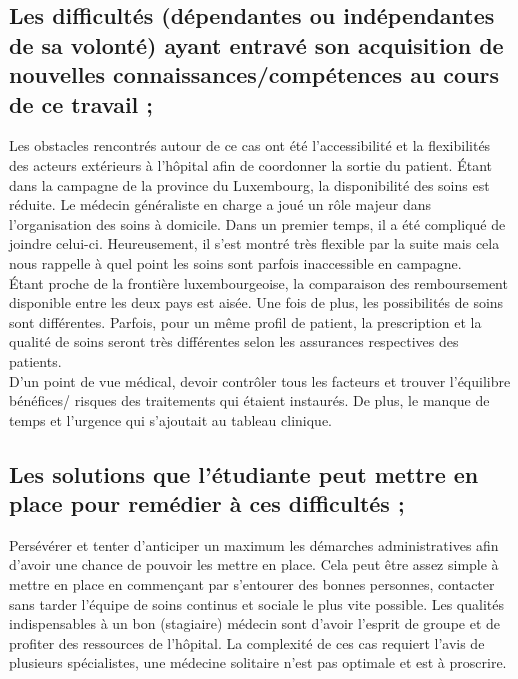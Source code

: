 \subsection{Les difficultés (dépendantes ou indépendantes de sa volonté) ayant entravé son acquisition de nouvelles connaissances/compétences au cours de ce travail ;}

Les obstacles rencontrés autour de ce cas ont été l’accessibilité et la flexibilités des acteurs extérieurs à l’hôpital afin de coordonner la sortie du patient. Étant dans la campagne de la province du Luxembourg, la disponibilité des soins est réduite. Le médecin généraliste en charge a joué un rôle majeur dans l’organisation des soins à domicile. Dans un premier temps, il a été compliqué de joindre celui-ci. Heureusement, il s’est montré très flexible par la suite mais cela nous rappelle à quel point les soins sont parfois inaccessible en campagne.\\

Étant proche de la frontière luxembourgeoise,  la comparaison des remboursement disponible entre les deux pays est aisée. Une fois de plus, les possibilités de soins sont différentes. Parfois, pour un même profil de patient, la prescription et la qualité de soins seront très différentes selon les assurances respectives des patients.\\

D’un point de vue médical, devoir contrôler tous les facteurs et trouver l’équilibre bénéfices/ risques des traitements qui étaient instaurés. De plus, le manque de temps et l’urgence qui s’ajoutait au tableau clinique. 

\subsection{Les solutions que l’étudiante peut mettre en place pour remédier à ces difficultés ;}

Persévérer et tenter d’anticiper un maximum les démarches administratives afin d’avoir une chance de pouvoir les mettre en place. Cela peut être assez simple à mettre en place en commençant par s’entourer des bonnes personnes, contacter sans tarder l’équipe de soins continus et sociale le plus vite possible. Les qualités indispensables à un bon (stagiaire) médecin sont d’avoir l’esprit de groupe et de profiter des ressources de l’hôpital. La complexité de ces cas requiert l’avis de plusieurs spécialistes, une médecine solitaire n’est pas optimale et est à proscrire. 
